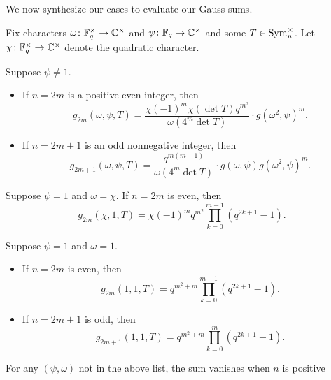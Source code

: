 We now synthesize our cases to evaluate our Gauss sums.
\begin{theorem} \label{thm:gsum-sym}
    Fix characters $\omega\colon\mathbb F_q^\times\to\mathbb C^\times$ and $\psi\colon\mathbb F_q\to\mathbb C^\times$ and some $T\in\operatorname{Sym}_n^\times$. Let $\chi\colon\mathbb F_q^\times\to\mathbb C^\times$ denote the quadratic character.
    \begin{listalph}
        \item Suppose $\psi\ne1$.
        \begin{itemize}
            \item If $n=2m$ is a positive even integer, then
            \[g_{2m}(\omega,\psi,T)=\frac{\chi(-1)^m\chi(\det T)q^{m^2}}{\omega(4^m\det T)}\cdot g\left(\omega^2,\psi\right)^m.\]
            \item If $n=2m+1$ is an odd nonnegative integer, then
            \[g_{2m+1}(\omega,\psi,T)=\frac{q^{m(m+1)}}{\omega(4^m\det T)}\cdot g(\omega,\psi)g\left(\omega^2,\psi\right)^m.\]
        \end{itemize}
        \item Suppose $\psi=1$ and $\omega=\chi$. If $n=2m$ is even, then
        \[g_{2m}(\chi,1,T)=\chi(-1)^mq^{m^2}\prod_{k=0}^{m-1}\left(q^{2k+1}-1\right).\]
        \item Suppose $\psi=1$ and $\omega=1$.
        \begin{itemize}
            \item If $n=2m$ is even, then
            \[g_{2m}(1,1,T)=q^{m^2+m}\prod_{k=0}^{m-1}\left(q^{2k+1}-1\right).\]
            \item If $n=2m+1$ is odd, then
            \[g_{2m+1}(1,1,T)=q^{m^2+m}\prod_{k=0}^{m}\left(q^{2k+1}-1\right).\]
        \end{itemize}
    \end{listalph}
    For any $(\psi,\omega)$ not in the above list, the sum vanishes when $n$ is positive
\end{theorem}
